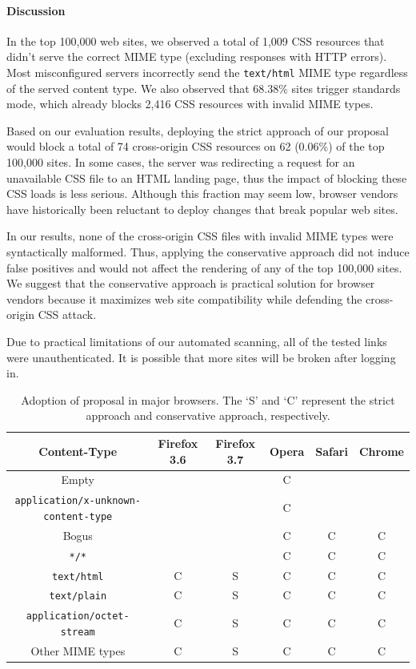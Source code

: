 \documentclass{acm_proc_article-sp}
\begin{document}
\paragraph{Discussion}
In the top 100,000 web sites, we observed a total of 1,009 CSS resources that didn't serve the correct MIME type (excluding responses with HTTP errors). Most misconfigured servers incorrectly send the \texttt{text/html} MIME type regardless of the served content type. We also observed that 68.38\% sites trigger standards mode, which already blocks 2,416 CSS resources with invalid MIME types.

Based on our evaluation results, deploying the strict approach of our proposal would block a total of 74 cross-origin CSS resources on 62 (0.06\%) of the top 100,000 sites. In some cases, the server was redirecting a request for an unavailable CSS file to an HTML landing page, thus the impact of blocking these CSS loads is less serious. Although this fraction may seem low, browser vendors have historically been reluctant to deploy changes that break popular web sites. 

In our results, none of the cross-origin CSS files with invalid MIME types were syntactically malformed. Thus, applying the conservative approach did not induce false positives and would not affect the rendering of any of the top 100,000 sites. We suggest that the conservative approach is practical solution for browser vendors because it maximizes web site compatibility while defending the cross-origin CSS attack.

Due to practical limitations of our automated scanning, all of the tested links were unauthenticated. It is possible that more sites will be broken after logging in.

\begin{table}
\centering
\begin{tabular}{|c|c|c|c|c|c|} \hline
Content-Type&Firefox 3.6&Firefox 3.7&Opera&Safari&Chrome\\ \hline
Empty&&&C&&\\ \hline
\texttt{application/x-unknown-content-type}&&&C&&\\ \hline
Bogus&&&C&C&C \\ \hline
\texttt{*/*}&&&C&C&C \\ \hline
\texttt{text/html}&C&S&C&C&C\\ \hline
\texttt{text/plain}&C&S&C&C&C\\ \hline
\texttt{application/octet-stream}&C&S&C&C&C\\ \hline
Other MIME types&C&S&C&C&C\\
\hline\end{tabular}
\caption{Adoption of proposal in major browsers. The `S' and `C' represent the strict approach and conservative approach, respectively.}
\label{table:adoption}
\end{table}
\end{document}
